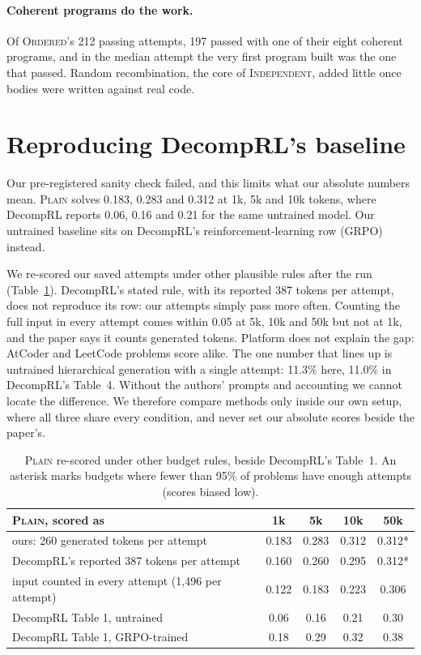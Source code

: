 \documentclass[11pt]{article}
\newcommand{\plain}{\textsc{Plain}}
\newcommand{\indep}{\textsc{Independent}}
\newcommand{\ordered}{\textsc{Ordered}}
\begin{document}
\paragraph{Coherent programs do the work.} Of \ordered's 212 passing attempts, 197 passed with one of their eight
coherent programs, and in the median attempt the very first program built was the one that passed. Random
recombination, the core of \indep, added little once bodies were written against real code.

\section{Reproducing DecompRL's baseline}
\label{sec:harness}

Our pre-registered sanity check failed, and this limits what our absolute numbers mean. \plain{} solves 0.183, 0.283
and 0.312 at 1k, 5k and 10k tokens, where DecompRL reports 0.06, 0.16 and 0.21 for the same untrained model. Our
untrained baseline sits on DecompRL's reinforcement-learning row (GRPO) instead.

We re-scored our saved attempts under other plausible rules after the run (Table~\ref{tab:harness}). DecompRL's stated
rule, with its reported 387 tokens per attempt, does not reproduce its row: our attempts simply pass more often.
Counting the full input in every attempt comes within 0.05 at 5k, 10k and 50k but not at 1k, and the paper says it
counts generated tokens. Platform does not explain the gap: AtCoder and LeetCode problems score alike. The one number
that lines up is untrained hierarchical generation with a single attempt: 11.3\% here, 11.0\% in DecompRL's Table~4.
Without the authors' prompts and accounting we cannot locate the difference. We therefore compare methods only inside
our own setup, where all three share every condition, and never set our absolute scores beside the paper's.

\begin{table}[t]
\centering
\caption{\plain{} re-scored under other budget rules, beside DecompRL's Table~1. An asterisk marks budgets where fewer
than 95\% of problems have enough attempts (scores biased low).}
\label{tab:harness}
\begin{tabular}{lcccc}
\toprule
\plain{}, scored as & 1k & 5k & 10k & 50k \\
\midrule
ours: 260 generated tokens per attempt & 0.183 & 0.283 & 0.312 & 0.312* \\
DecompRL's reported 387 tokens per attempt & 0.160 & 0.260 & 0.295 & 0.312* \\
input counted in every attempt (1,496 per attempt) & 0.122 & 0.183 & 0.223 & 0.306 \\
\midrule
DecompRL Table 1, untrained & 0.06 & 0.16 & 0.21 & 0.30 \\
DecompRL Table 1, GRPO-trained & 0.18 & 0.29 & 0.32 & 0.38 \\
\bottomrule
\end{tabular}
\end{table}
\end{document}
